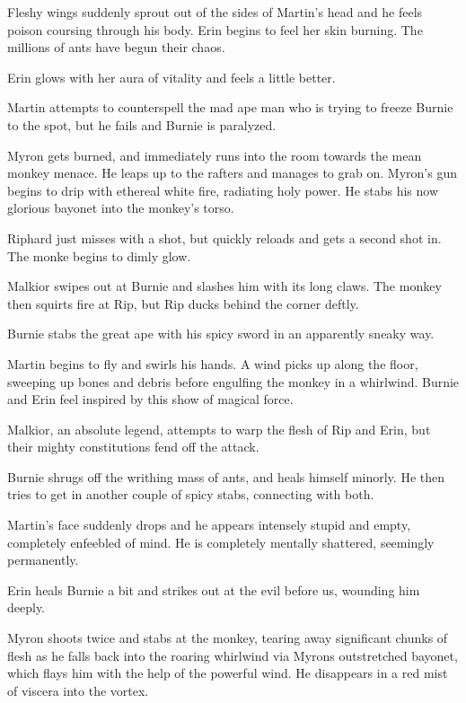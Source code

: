 Fleshy wings suddenly sprout out of the sides of Martin’s head and he feels poison coursing through his body. Erin begins to feel her skin burning. The millions of ants have begun their chaos.\medskip

Erin glows with her aura of vitality and feels a little better.\medskip

Martin attempts to counterspell the mad ape man who is trying to freeze Burnie to the spot, but he fails and Burnie is paralyzed.\medskip

Myron gets burned, and immediately runs into the room towards the mean monkey menace. He leaps up to the rafters and manages to grab on. Myron’s gun begins to drip with ethereal white fire, radiating holy power. He stabs his now glorious bayonet into the monkey's torso.\medskip

Riphard just misses with a shot, but quickly reloads and gets a second shot in. The monke begins to dimly glow.\medskip

Malkior swipes out at Burnie and slashes him with its long claws. The monkey then squirts fire at Rip, but Rip ducks behind the corner deftly.\medskip

Burnie stabs the great ape with his spicy sword in an apparently sneaky way.\medskip

Martin begins to fly and swirls his hands. A wind picks up along the floor, sweeping up bones and debris before engulfing the monkey in a whirlwind. Burnie and Erin feel inspired by this show of magical force.\medskip

Malkior, an absolute legend, attempts to warp the flesh of Rip and Erin, but their mighty constitutions fend off the attack.\medskip

Burnie shrugs off the writhing mass of ants, and heals himself minorly. He then tries to get in another couple of spicy stabs, connecting with both.\medskip

Martin’s face suddenly drops and he appears intensely stupid and empty, completely enfeebled of mind. He is completely mentally shattered, seemingly permanently.\medskip

Erin heals Burnie a bit and strikes out at the evil before us, wounding him deeply.\medskip

Myron shoots twice and stabs at the monkey, tearing away significant chunks of flesh as he falls back into the roaring whirlwind via Myrons outstretched bayonet, which flays him with the help of the powerful wind. He disappears in a red mist of viscera into the vortex.\medskip

